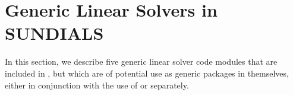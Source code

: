 \chapter{Generic Linear Solvers in SUNDIALS}\label{s:gen_linsolv}
In this section, we describe five generic linear solver code modules that 
are included in {\idas}, but which are of potential use as generic packages in
themselves, either in conjunction with the use of {\idas} or separately.



